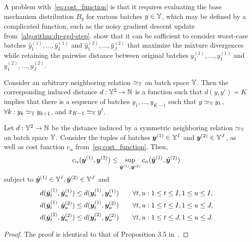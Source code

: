 A problem with~\cref{eq:cost_function} is that it requires evaluating the base mechanism distribution $B_y$ for various batches $y \in {\mathbb{Y}}$, which may be defined by a complicated function, such as the noisy gradient descent update from~\cref{algorithm:dp-sgd-step}. \citet{schuchardt2024unified} show that it can be sufficient to consider worst-case batches $\hat{y}^{(1)}_1,\dots,\hat{y}^{(1)}_I$ and $\hat{y}^{(2)}_1,\dots,\hat{y}^{(2)}_J$ that maximize the mixture divergences while retaining the pairwise distance between original batches $y^{(1)}_1,\dots,y^{(1)}_I$ and $y^{(2)}_1,\dots,y^{(2)}_J$.
\begin{definition}
    Consider an arbitrary neighboring relation $\simeq_{\mathbb{Y}}$ on batch space ${\mathbb{Y}}$.
    Then the corresponding induced distance $d : {\mathbb{Y}}^2 \rightarrow {\mathbb{N}}$ is a function such that $d(y,y') = K$ implies that there is a sequence of batches $y_1,\dots,y_{K-1}$ such that $y \simeq_{\mathbb{Y}} y_1$, $\forall k: y_k \simeq_{\mathbb{Y}} y_{k+1}$, and $x_{K-1} \simeq_{\mathbb{Y}} y'$.
\end{definition}
\begin{lemma}\label{lemma:cost_function_upper_bound}
    Let $d : {\mathbb{Y}}^2 \rightarrow {\mathbb{N}}$ be the distance induced by a symmetric neighboring relation $\simeq_{\mathbb{Y}}$ on batch space ${\mathbb{Y}}$.
    Consider the tuples of batches ${\bm{y}}^{(1)} \in {\mathbb{Y}}^I$ and ${\bm{y}}^{(2)} \in {\mathbb{Y}}^J$, as well as cost function $c_\alpha$ from~\cref{eq:cost_function}.
    Then,
    \begin{equation*}
        c_\alpha({\bm{y}}^{(1)}, {\bm{y}}^{(2)})
        \leq
        \sup_{\hat{{\bm{y}}}^{(1)}, \hat{{\bm{y}}}^{(2)}} c_\alpha(\hat{{\bm{y}}}^{(1)}, \hat{{\bm{y}}}^{(2)})
    \end{equation*}
    subject to $\hat{{\bm{y}}}^{(1)} \in {\mathbb{Y}}^I, \hat{{\bm{y}}}^{(2)} \in {\mathbb{Y}}^J$ and 
    \begin{align*}
        & d(\hat{{\bm{y}}}^{(1)}_t, \hat{{\bm{y}}}^{(1)}_u) \leq d({\bm{y}}^{(1)}_t, {\bm{y}}^{(1)}_u) \qquad \forall t, u: 1 \leq t \leq I, 1 \leq u \leq I, \\
        & d(\hat{{\bm{y}}}^{(1)}_t, \hat{{\bm{y}}}^{(2)}_u) \leq d({\bm{y}}^{(1)}_t, {\bm{y}}^{(2)}_u) \qquad \forall t,u : 1 \leq t \leq I, 1 \leq u \leq J, \\
        & d(\hat{{\bm{y}}}^{(2)}_t, \hat{{\bm{y}}}^{(2)}_u) \leq d({\bm{y}}^{(2)}_t, {\bm{y}}^{(2)}_u) \qquad \forall t, u: 1 \leq t \leq J, 1 \leq u \leq J.
    \end{align*}
\end{lemma}
\begin{proof}
    The proof is identical to that of Proposition 3.5 in~\cite{schuchardt2024unified}.
\end{proof}
